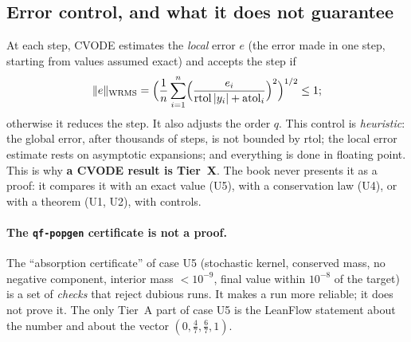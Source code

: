 \subsection{Error control, and what it does not guarantee}
At each step, CVODE estimates the \emph{local} error $e$ (the error made in one step, starting from values assumed
exact) and accepts the step if
\[\|e\|_{\mathrm{WRMS}}=\Bigl(\frac1n\sum_{i=1}^n\Bigl(\frac{e_i}{\mathrm{rtol}\,|y_i|+\mathrm{atol}_i}\Bigr)^2\Bigr)^{1/2}\le1;\]
otherwise it reduces the step. It also adjusts the order $q$. This control is \emph{heuristic}: the global error, after
thousands of steps, is not bounded by rtol; the local error estimate rests on asymptotic expansions; and everything is
done in floating point. This is why \textbf{a CVODE result is Tier~X}. The book never presents it as a proof: it
compares it with an exact value (U5), with a conservation law (U4), or with a theorem (U1, U2), with controls.

\paragraph{The \texttt{qf-popgen} certificate is not a proof.} The ``absorption certificate'' of case U5 (stochastic
kernel, conserved mass, no negative component, interior mass $<10^{-9}$, final value within $10^{-8}$ of the target) is
a set of \emph{checks} that reject dubious runs. It makes a run more reliable; it does not prove it. The only Tier~A
part of case U5 is the LeanFlow statement about the number  and about the vector
$(0,\frac47,\frac67,1)$.

